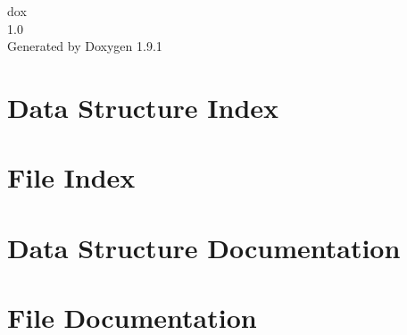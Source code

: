 \let\mypdfximage\pdfximage\def\pdfximage{\immediate\mypdfximage}\documentclass[twoside]{book}
\newcommand{\+}{\discretionary{\mbox{\scriptsize$\hookleftarrow$}}{}{}}
\newcommand{\clearemptydoublepage}{%
  \newpage{\pagestyle{empty}\cleardoublepage}%
}
\begin{document}
\raggedbottom

\hypersetup{pageanchor=false,
             bookmarksnumbered=true,
             pdfencoding=unicode
            }
\begin{titlepage}
\vspace*{7cm}
\begin{center}%
{\Large dox \\[1ex]\large 1.\+0 }\\
\vspace*{1cm}
{\large Generated by Doxygen 1.9.1}\\
\end{center}
\end{titlepage}
\clearemptydoublepage
{}
\tableofcontents
\clearemptydoublepage
{}
\hypersetup{pageanchor=true}

\chapter{Data Structure Index}

\chapter{File Index}

\chapter{Data Structure Documentation}






\chapter{File Documentation}




\backmatter
\newpage
{}
\clearemptydoublepage
{}
\printindex
\end{document}
